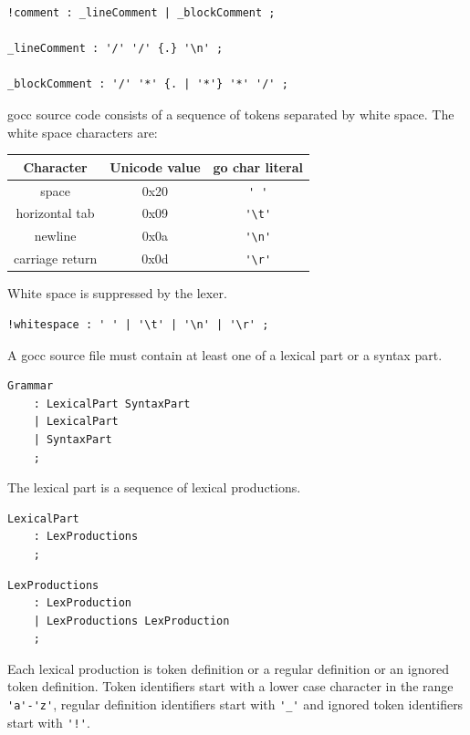 \documentclass[12pt]{article}
\begin{document}
	\begin{Verbatim}[frame=single]
!comment : _lineComment | _blockComment ;

_lineComment : '/' '/' {.} '\n' ;

_blockComment : '/' '*' {. | '*'} '*' '/' ;
	\end{Verbatim}

	gocc source code consists of a sequence of tokens separated by white space. The white space characters are:

	\begin{tabular}{ccc}
		\bf Character & \bf Unicode value & \bf go char literal\\
		\hline
		space	& 0x20 & \verb|' '| \\
		horizontal tab & 0x09 & \verb|'\t'| \\
		newline & 0x0a & \verb|'\n'| \\
		carriage return & 0x0d & \verb|'\r'| \\
	\end{tabular}

	White space is suppressed by the lexer.

	\begin{Verbatim}[frame=single]
!whitespace : ' ' | '\t' | '\n' | '\r' ;
	\end{Verbatim}



	A gocc source file must contain at least one of a lexical part or a syntax part.

	\begin{Verbatim}[frame=single]
Grammar
    : LexicalPart SyntaxPart
    | LexicalPart
    | SyntaxPart
    ;
\end{Verbatim}

The lexical part is a sequence of lexical productions.

\begin{Verbatim}[frame=single]
LexicalPart
    : LexProductions
    ;
\end{Verbatim}

\begin{Verbatim}[frame=single]
LexProductions
    : LexProduction
    | LexProductions LexProduction
    ;
\end{Verbatim}

Each lexical production is token definition or a regular definition or an ignored token definition. Token identifiers start with a lower case character in the range \verb|'a'-'z'|, regular definition identifiers start with \verb|'_'| and ignored token identifiers start with \verb|'!'|.
\end{document}
